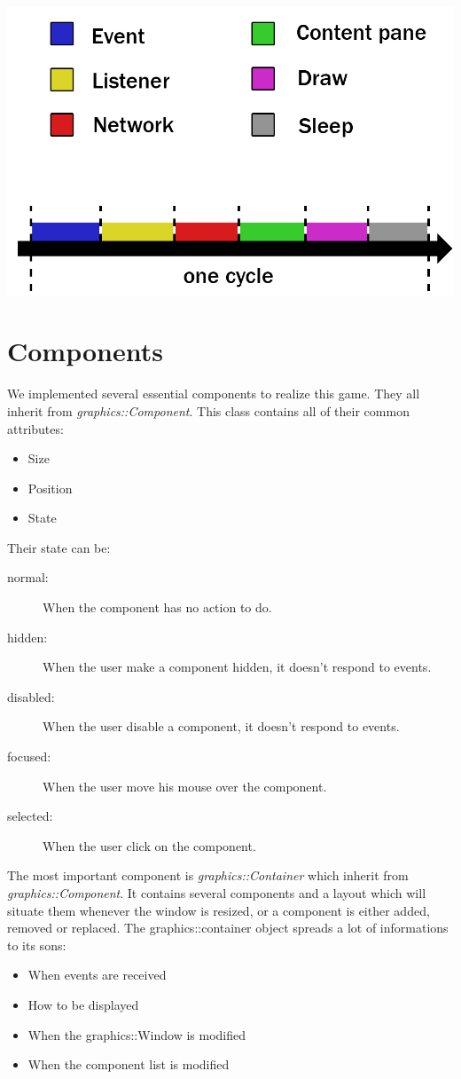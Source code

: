 \documentclass{scrreprt}
\begin{document}
		\begin{center}
		\includegraphics[scale=0.3]{windowCycle.jpg}
		\end{center}

		\section{Components}
		We implemented several essential components to realize this game. They all inherit from \emph{graphics::Component}. This class contains all of their common attributes:
			\begin{itemize}
			\item{Size}
			\item{Position}
			\item{State}
			\end{itemize}

			Their state can be:
			\begin{description}
			\item[normal:]{When the component has no action to do.}
			\item[hidden:]{When the user make a component hidden, it doesn't respond to events.}
			\item[disabled:]{When the user disable a component, it doesn't respond to events.}
			\item[focused:]{When the user move his mouse over the component.}
			\item[selected:]{When the user click on the component.}
			\end{description}

		  The most important component is \emph{graphics::Container} which inherit from \emph{graphics::Component}. It contains several components and a layout which will situate them whenever the window is resized, or a component is either added, removed or replaced. The graphics::container object spreads a lot of informations to its sons:
		  \begin{itemize}
		  \item{When events are received}
		  \item{How to be displayed}
		  \item{When the graphics::Window is modified}
		  \item{When the component list is modified}
		  \end{itemize}
\end{document}
